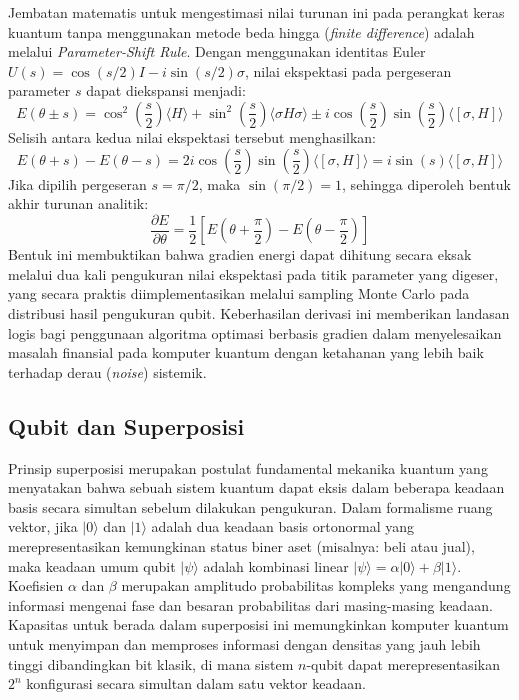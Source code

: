 Jembatan matematis untuk mengestimasi nilai turunan ini pada perangkat keras kuantum tanpa menggunakan metode beda hingga (\textit{finite difference}) adalah melalui \textit{Parameter-Shift Rule}. Dengan menggunakan identitas Euler $U(s) = \cos(s/2)I - i\sin(s/2)\sigma$, nilai ekspektasi pada pergeseran parameter $s$ dapat diekspansi menjadi:
\begin{equation}
    E(\theta \pm s) = \cos^2\left(\frac{s}{2}\right)\langle H \rangle + \sin^2\left(\frac{s}{2}\right)\langle \sigma H \sigma \rangle \pm i\cos\left(\frac{s}{2}\right)\sin\left(\frac{s}{2}\right)\langle [\sigma, H] \rangle
\end{equation}
Selisih antara kedua nilai ekspektasi tersebut menghasilkan:
\begin{equation}
    E(\theta + s) - E(\theta - s) = 2i\cos\left(\frac{s}{2}\right)\sin\left(\frac{s}{2}\right)\langle [\sigma, H] \rangle = i\sin(s)\langle [\sigma, H] \rangle
\end{equation}
Jika dipilih pergeseran $s = \pi/2$, maka $\sin(\pi/2) = 1$, sehingga diperoleh bentuk akhir turunan analitik:
\begin{equation}
    \frac{\partial E}{\partial \theta} = \frac{1}{2} \left[ E\left(\theta + \frac{\pi}{2}\right) - E\left(\theta - \frac{\pi}{2}\right) \right]
\end{equation}
Bentuk ini membuktikan bahwa gradien energi dapat dihitung secara eksak melalui dua kali pengukuran nilai ekspektasi pada titik parameter yang digeser, yang secara praktis diimplementasikan melalui sampling Monte Carlo pada distribusi hasil pengukuran qubit. Keberhasilan derivasi ini memberikan landasan logis bagi penggunaan algoritma optimasi berbasis gradien dalam menyelesaikan masalah finansial pada komputer kuantum dengan ketahanan yang lebih baik terhadap derau (\textit{noise}) sistemik.


\subsection{Qubit dan Superposisi}

Prinsip superposisi merupakan postulat fundamental mekanika kuantum yang menyatakan bahwa sebuah sistem kuantum dapat eksis dalam beberapa keadaan basis secara simultan sebelum dilakukan pengukuran. Dalam formalisme ruang vektor, jika $|0\rangle$ dan $|1\rangle$ adalah dua keadaan basis ortonormal yang merepresentasikan kemungkinan status biner aset (misalnya: beli atau jual), maka keadaan umum qubit $|\psi\rangle$ adalah kombinasi linear $|\psi\rangle = \alpha|0\rangle + \beta|1\rangle$. Koefisien $\alpha$ dan $\beta$ merupakan amplitudo probabilitas kompleks yang mengandung informasi mengenai fase dan besaran probabilitas dari masing-masing keadaan. Kapasitas untuk berada dalam superposisi ini memungkinkan komputer kuantum untuk menyimpan dan memproses informasi dengan densitas yang jauh lebih tinggi dibandingkan bit klasik, di mana sistem $n$-qubit dapat merepresentasikan $2^n$ konfigurasi secara simultan dalam satu vektor keadaan.


